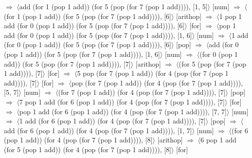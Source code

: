\documentclass[12pt]{report}
\begin{document}
$\Rightarrow$ $\langle$add (for 1 (pop 1 add)) (for 5 (pop (for 7 (pop 1 add)))), [1, 5]$\rangle$ \hfill [num] \newline
$\Rightarrow$ $\langle$(for 1 (pop 1 add)) (for 5 (pop (for 7 (pop 1 add)))), [6]$\rangle$ \hfill [arithop] \newline
$\Rightarrow$ $\langle$1 pop 1 add (for 0 (pop 1 add)) (for 5 (pop (for 7 (pop 1 add)))), [6]$\rangle$ \hfill [for] \newline
$\Rightarrow$ $\langle$pop 1 add (for 0 (pop 1 add)) (for 5 (pop (for 7 (pop 1 add)))), [1, 6]$\rangle$ \hfill [num] \newline
$\Rightarrow$ $\langle$1 add (for 0 (pop 1 add)) (for 5 (pop (for 7 (pop 1 add)))), [6]$\rangle$ \hfill [pop] \newline
$\Rightarrow$ $\langle$add (for 0 (pop 1 add)) (for 5 (pop (for 7 (pop 1 add)))), [1, 6]$\rangle$ \hfill [num] \newline
$\Rightarrow$ $\langle$(for 0 (pop 1 add)) (for 5 (pop (for 7 (pop 1 add)))), [7]$\rangle$ \hfill [arithop] \newline
$\Rightarrow$ $\langle$(for 5 (pop (for 7 (pop 1 add)))), [7]$\rangle$ \hfill [for] \newline
$\Rightarrow$ $\langle$5 pop (for 7 (pop 1 add)) (for 4 (pop (for 7 (pop 1 add)))), [7]$\rangle$ \hfill [for] \newline
$\Rightarrow$ $\langle$pop (for 7 (pop 1 add)) (for 4 (pop (for 7 (pop 1 add)))), [5, 7]$\rangle$ \hfill [num] \newline
$\Rightarrow$ $\langle$(for 7 (pop 1 add)) (for 4 (pop (for 7 (pop 1 add)))), [7]$\rangle$ \hfill [pop] \newline
$\Rightarrow$ $\langle$7 pop 1 add (for 6 (pop 1 add)) (for 4 (pop (for 7 (pop 1 add)))), [7]$\rangle$ \hfill [for] \newline
$\Rightarrow$ $\langle$pop 1 add (for 6 (pop 1 add)) (for 4 (pop (for 7 (pop 1 add)))), [7, 7]$\rangle$ \hfill [num] \newline
$\Rightarrow$ $\langle$1 add (for 6 (pop 1 add)) (for 4 (pop (for 7 (pop 1 add)))), [7]$\rangle$ \hfill [pop] \newline
$\Rightarrow$ $\langle$add (for 6 (pop 1 add)) (for 4 (pop (for 7 (pop 1 add)))), [1, 7]$\rangle$ \hfill [num] \newline
$\Rightarrow$ $\langle$(for 6 (pop 1 add)) (for 4 (pop (for 7 (pop 1 add)))), [8]$\rangle$ \hfill [arithop] \newline
$\Rightarrow$ $\langle$6 pop 1 add (for 5 (pop 1 add)) (for 4 (pop (for 7 (pop 1 add)))), [8]$\rangle$ \hfill [for] \newline
\end{document}
